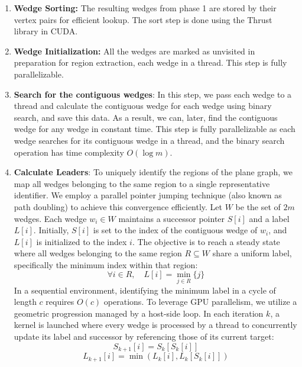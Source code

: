 \begin{enumerate}
    \item \textbf{Wedge Sorting:} The resulting wedges from phase 1 are stored by their vertex pairs for efficient lookup. The sort step is done using the Thrust library in CUDA.
    \item \textbf{Wedge Initialization:} All the wedges are marked as unvisited in preparation for region extraction, each wedge in a thread. This step is fully parallelizable.
    \item \textbf{Search for the contiguous wedges}: In this step, we pass each wedge to a thread and calculate the contiguous wedge for each wedge using binary search, and save this data. As a result, we can, later, find the contiguous wedge for any wedge in constant time. This step is fully parallelizable as each wedge searches for its contiguous wedge in a thread, and the binary search operation has time complexity \(O(\log m)\).
    \item \textbf{Calculate Leaders}: To uniquely identify the regions of the plane graph, we map all wedges belonging to the same region to a single representative identifier. We employ a parallel pointer jumping technique (also known as path doubling) to achieve this convergence efficiently. Let $W$ be the set of $2m$ wedges. Each wedge $w_i \in W$ maintains a successor pointer $S[i]$ and a label $L[i]$. Initially, $S[i]$ is set to the index of the contiguous wedge of $w_i$, and $L[i]$ is initialized to the index $i$. The objective is to reach a steady state where all wedges belonging to the same region $R \subseteq W$ share a uniform label, specifically the minimum index within that region:
    $$\forall i \in R, \quad L[i] = \min_{j \in R} \{j\}$$
    In a sequential environment, identifying the minimum label in a cycle of length $c$ requires $O(c)$ operations. To leverage GPU parallelism, we utilize a geometric progression managed by a host-side loop. In each iteration $k$, a kernel is launched where every wedge is processed by a thread to concurrently update its label and successor by referencing those of its current target:
    $$S_{k+1}[i] = S_k[S_k[i]]$$
    $$L_{k+1}[i] = \min(L_k[i], L_k[S_k[i]])$$

\end{enumerate}
